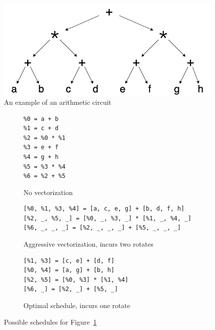 \begin{figure}
    \includegraphics[width=0.6\linewidth]{figures/compilation_overview/coyote_running_example.drawio.png}
    \caption{An example of an arithmetic circuit}\label{fig:example-circuit}
\end{figure}


\begin{figure}
    \begin{subfigure}{0.2\columnwidth}
        \begin{verbatim}
%0 = a + b
%1 = c + d
%2 = %0 * %1
%3 = e + f
%4 = g + h
%5 = %3 * %4
%6 = %2 + %5
        \end{verbatim}
        \caption{No vectorization}\label{fig:no-vectorization}
    \end{subfigure}
    \begin{subfigure}{0.6\columnwidth}
        \begin{verbatim}
[%0, %1, %3, %4] = [a, c, e, g] + [b, d, f, h]
[%2, _, %5, _] = [%0, _, %3, _] * [%1, _, %4, _]
[%6, _, _, _] = [%2, _, _, _] + [%5, _, _, _]
        \end{verbatim}
        \caption{Aggressive vectorization, incurs two rotates}\label{fig:aggressive-vectorization}
    \end{subfigure}
    \begin{subfigure}{0.4\columnwidth}
        \begin{verbatim}
[%1, %3] = [c, e] + [d, f]
[%0, %4] = [a, g] + [b, h]
[%2, %5] = [%0, %3] * [%1, %4]
[%6, _] = [%2, _] + [%5, _]
        \end{verbatim}
        \caption{Optimal schedule, incurs one rotate}\label{fig:optimal-schedule}
    \end{subfigure}
    \caption{Possible schedules for Figure~\ref{fig:example-circuit}}
\end{figure}

